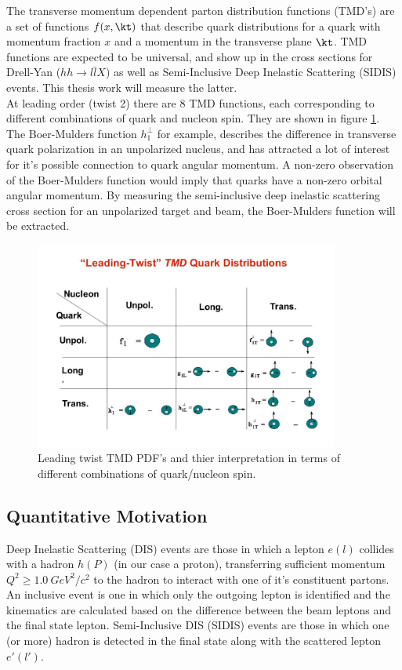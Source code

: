 The transverse momentum dependent parton distribution functions (TMD's) are a set of functions $f(x,\kt)$ that describe quark distributions for a quark with momentum fraction $x$ and a momentum in the transverse plane $\kt$.  TMD functions are expected to be universal, and show up in the cross sections for Drell-Yan ($hh \rightarrow l \bar{l}X$) as well as Semi-Inclusive Deep Inelastic Scattering (SIDIS) events.  This thesis work will measure the latter.  \\

At leading order (twist 2) there are 8 TMD functions, each corresponding to different combinations of quark and nucleon spin.  They are shown in figure \ref{fig:tmd-table}.  The Boer-Mulders function $h_{1}^{\perp}$ for example, describes the difference in transverse quark polarization in an unpolarized nucleus, and has attracted a lot of interest for it's possible connection to quark angular momentum.  A non-zero observation of the Boer-Mulders function would imply that quarks have a non-zero orbital angular momentum.  By measuring the semi-inclusive deep inelastic scattering cross section for an unpolarized target and beam, the Boer-Mulders function will be extracted.

\begin{figure}
  \centering
  \includegraphics[width=10cm]{image/tmd-table.jpg}
  \caption{Leading twist TMD PDF's and thier interpretation in terms of different combinations of quark/nucleon spin.}
  \label{fig:tmd-table}
\end{figure}

\subsection{Quantitative Motivation}

Deep Inelastic Scattering (DIS) events are those in which a lepton $e(l)$ collides with a hadron $h(P)$ (in our case a proton), transferring sufficient momentum $Q^{2} \geq 1.0 \: GeV^{2}/c^{2}$ to the hadron to interact with one of it's constituent partons.  An inclusive event is one in which only the outgoing lepton is identified and the kinematics are calculated based on the difference between the beam leptons and the final state lepton.  Semi-Inclusive DIS (SIDIS) events are those in which one (or more) hadron is detected in the final state along with the scattered lepton $e'(l')$.  

